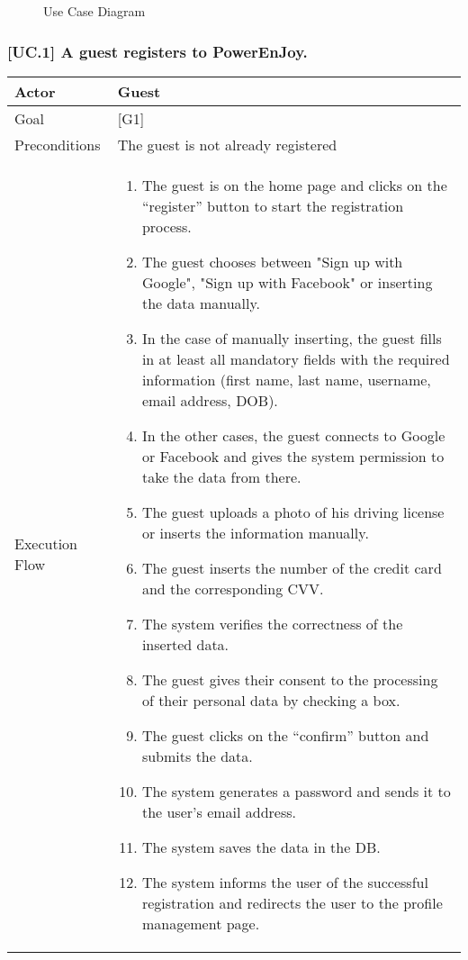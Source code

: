 \documentclass[english]{article}
\begin{document}
	\begin{figure}
		\centering
		\makebox[\textwidth][c]{
			\def\svgwidth{400pt}		
			
		}
		\caption{Use Case Diagram}
	\end{figure}
	\newpage
	\subsubsection{[UC.1] A guest registers to PowerEnJoy.}
	\begin{tabularx}{\textwidth}{  l  X  }
		\hline
		Actor & Guest\\
		\hline
		Goal & [G1]\\
		\hline
		Preconditions & The guest is not already registered\\
		\hline
		Execution Flow & \begin{enumerate}
			\item{The guest is on the home page and clicks on the “register” button to start the registration process.}
			\item{The guest chooses between "Sign up with Google", "Sign up with Facebook" or inserting the data manually.}
			\item{In the case of manually inserting, the guest fills in at least all mandatory fields with the required information (first name, last name, username, email address, DOB).}
			\item{In the other cases, the guest connects to Google or Facebook and gives the system permission to take the data from there.}
			\item{The guest uploads a photo of his driving license or inserts the information manually.}
			\item{The guest inserts the number of the credit card and the corresponding CVV}.
			\item{The system verifies the correctness of the inserted data.}
			\item{The guest gives their consent to the processing of their personal data by checking a box.}
			\item{The guest clicks on the “confirm” button and submits the data.}
			\item{The system generates a password and sends it to the user's email address.}
			\item{The system  saves the data in the DB.}
			\item{The system informs the user of the successful registration and redirects the user to the profile management page.}
		\end{enumerate}\\
		\hline
	\end{tabularx}
\end{document}
